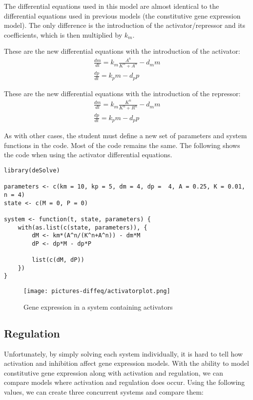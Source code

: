 The differential equations used in this model are almost identical to the differential equations used in previous models (the constitutive gene expression model). The only difference is the introduction of the activator/repressor and its coefficients, which is then multiplied by $k_{m}$. 

These are the new differential equations with the introduction of the activator:
\begin{gather*}
    \frac{dm}{dt}=k_{m}\frac{A^{n}}{K^{n}+A^{n}}-d_{m}m\\
    \frac{dp}{dt}=k_{p}m-d_{p}p
\end{gather*}

These are the new differential equations with the introduction of the repressor:
\begin{gather*}
    \frac{dm}{dt}=k_{m}\frac{K^{n}}{K^{n}+R^{n}}-d_{m}m\\
    \frac{dp}{dt}=k_{p}m-d_{p}p
\end{gather*}

As with other cases, the student must define a new set of parameters and system functions in the code. Most of the code remains the same. The following shows the code when using the activator differential equations.

\begin{lstlisting}
library(deSolve)

parameters <- c(km = 10, kp = 5, dm = 4, dp =  4, A = 0.25, K = 0.01, n = 4)
state <- c(M = 0, P = 0)

system <- function(t, state, parameters) {
    with(as.list(c(state, parameters)), {
        dM <- km*(A^n/(K^n+A^n)) - dm*M
        dP <- dp*M - dp*P
        
        list(c(dM, dP))
    })
}
\end{lstlisting}

\begin{figure}[H]
    \centering
    \texttt{[image: pictures-diffeq/activatorplot.png]}
    \caption{Gene expression in a system containing activators}
\end{figure}

\subsection{Regulation}

Unfortunately, by simply solving each system individually, it is hard to tell how activation and inhibition affect gene expression models. With the ability to model constitutive gene expression along with activation and regulation, we can compare models where activation and regulation does occur. Using the following values, we can create three concurrent systems and compare them:\\

